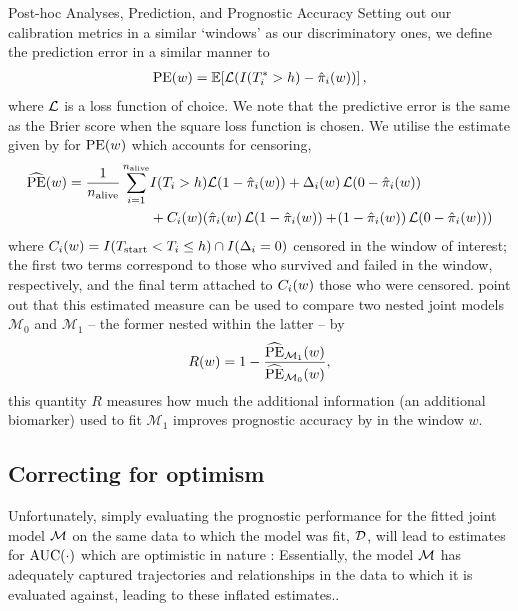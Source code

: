 \begin{chapter}{\label{cha:posthoc}Post-hoc Analyses, Prediction, and Prognostic Accuracy}
Setting out our calibration metrics in a similar `windows' as our discriminatory ones, we define the prediction error in a similar manner to \eg \citet{Rizopoulos2017}
\begin{align}
    \mathrm{PE}\!\left( w\right) = \operatorname{\mathbb{E}}\!\left[\mathcal{L}\!\left( I\!\left( T_i^*>h\right) - \hat{\pi}_i\!\left( w\right)\right)\right],
\end{align}
where $\cal L$ is a loss function of choice. We note that the predictive error is the same as the Brier score when the square loss function is chosen. We utilise the estimate given by \citet{Henderson2002} for $\mathrm{PE}\!\left( w\right)$ which accounts for censoring,
\begin{equation}
    \begin{aligned}
        \widehat{\mathrm{PE}}\lb w\rb = \frac{1}{\nalive}\sum_{i=1}^{\nalive}&I(T_i>h)\cL\lb1-\hpw\rb 
        + \Delta_i\lb w\rb\cL\lb0-\hpw\rb \\&+ C_i\lb w\rb\lb\hpw\cL\lb1-\hpw\rb+\lb1-\hpw\rb\cL\lb0-\hpw\rb\rb
    \end{aligned}
\label{eq:posthocs-PE-censoring}
\end{equation}
where $C_i\!\left( w\right)=I\!\left(T_{\mathrm{start}}<T_i\le h\right)\cap I(\Delta_i=0)$ \ie censored in the window of interest; the first two terms correspond to those who survived and failed in the window, respectively, and the final term attached to $C_i\!\left( w\right)$ those who were censored. \citet{Rizopoulos2017} point out that this estimated measure can be used to compare two nested joint models $\mathcal{M}_0$ and $\mathcal{M}_1$ -- the former nested within the latter -- by 
\begin{equation}
    R\!\left( w\right) = 1 - \frac{\widehat{\mathrm{PE}}_{\mathcal{M}_1}\!\left( w\right)}{\widehat{\mathrm{PE}}_{\mathcal{M}_0}\!\left( w\right)},
\label{eq:posthocs-Rvalue}
\end{equation}
this quantity $R$ measures how much the additional information (\eg an additional biomarker) used to fit $\mathcal{M}_1$ improves prognostic accuracy by in the window $w$.

\subsection{Correcting for optimism}\label{sec:posthocs-prognostics-correction}
Unfortunately, simply evaluating the prognostic performance for the fitted joint model $\cal M$ on the same data to which the model was fit, $\cal D$, will lead to estimates for \eg $\mathrm{AUC}\!\left(\cdot\right)$ which are optimistic in nature \citep{Andrinopoulou2021, vanSmeden2021}: Essentially, the model $\cal M$ has adequately captured \eg trajectories and relationships in the data to which it is evaluated against, leading to these inflated estimates.. 


\end{chapter}
